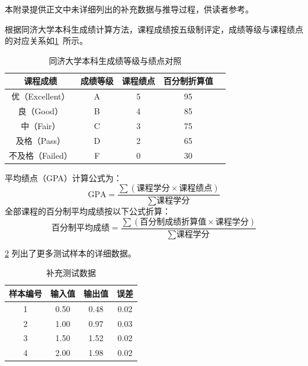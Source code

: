 \label{sec:appendix-data}

本附录提供正文中未详细列出的补充数据与推导过程，供读者参考。


根据同济大学本科生成绩计算方法，课程成绩按五级制评定，成绩等级与课程绩点的对应关系如\cref{tab:grading-system}~所示。

\begin{table}[!htb]
  \caption{同济大学本科生成绩等级与绩点对照}\label{tab:grading-system}
  \centering
  \begin{tabular*}{\linewidth}{@{\extracolsep{\fill}}ccccc@{}} \toprule
    \textbf{课程成绩} & \textbf{成绩等级} & \textbf{课程绩点} & \textbf{百分制折算值} \\ \midrule
    优（Excellent） & A & 5 & 95 \\
    良（Good）      & B & 4 & 85 \\
    中（Fair）      & C & 3 & 75 \\
    及格（Pass）    & D & 2 & 65 \\
    不及格（Failed）& F & 0 & 30 \\ \bottomrule
  \end{tabular*}
\end{table}

平均绩点（GPA）计算公式为：
\begin{equation}\label{eq:gpa}
  \text{GPA} = \frac{\sum(\text{课程学分} \times \text{课程绩点})}{\sum\text{课程学分}}
\end{equation}
全部课程的百分制平均成绩按以下公式折算：
\begin{equation}\label{eq:avg-score}
  \text{百分制平均成绩} = \frac{\sum(\text{百分制成绩折算值} \times \text{课程学分})}{\sum\text{课程学分}}
\end{equation}


\cref{tab:appendix-sample} 列出了更多测试样本的详细数据。

\begin{table}[!htb]
  \caption{补充测试数据}\label{tab:appendix-sample}
  \centering
  \begin{tabular*}{\linewidth}{@{\extracolsep{\fill}}cccc@{}} \toprule
    \textbf{样本编号} & \textbf{输入值} & \textbf{输出值} & \textbf{误差} \\ \midrule
    1 & 0.50 & 0.48 & 0.02 \\
    2 & 1.00 & 0.97 & 0.03 \\
    3 & 1.50 & 1.52 & 0.02 \\
    4 & 2.00 & 1.98 & 0.02 \\ \bottomrule
  \end{tabular*}
\end{table}
